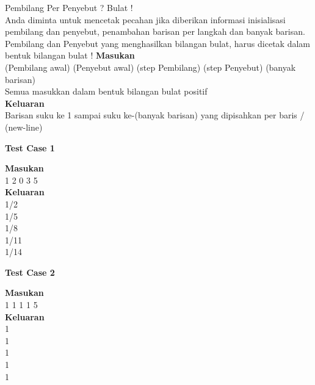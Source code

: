 \newpage
\begin{permasalahan}{Pembilang Per Penyebut ? Bulat !}\\
\label{prob:PembilangPerPenyebut}
	Anda diminta untuk mencetak pecahan jika diberikan informasi inisialisasi pembilang dan penyebut, penambahan barisan per langkah dan banyak barisan. \\
	Pembilang dan Penyebut yang menghasilkan bilangan bulat, harus dicetak dalam bentuk bilangan bulat !
	\textbf{Masukan}\\
	(Pembilang awal) (Penyebut awal) (step Pembilang) (step Penyebut) (banyak barisan) \\
	Semua masukkan dalam bentuk bilangan bulat positif\\
	\textbf{Keluaran}\\
	Barisan suku ke 1 sampai suku ke-(banyak barisan) yang dipisahkan per baris / (new-line)\\
	\begin{center}
	\textbf{Test Case 1}\\
	\end{center}
	\textbf{Masukan}\\
	1 2 0 3 5\\
	\textbf{Keluaran}\\
	1/2\\
	1/5\\
	1/8\\
	1/11\\
	1/14\\
	\begin{center}
	\textbf{Test Case 2}\\
	\end{center}
	\textbf{Masukan}\\
	1 1 1 1 5\\
	\textbf{Keluaran}\\
	1\\
	1\\
	1\\
	1\\
	1\\
\end{permasalahan}



